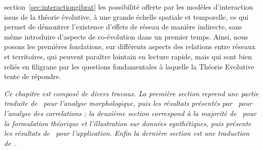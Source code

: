 section~\ref{sec:interactiongibrat} les possibilité offerte par les modèles d'interaction issus de la théorie évolutive, à une grande échelle spatiale et temporelle, ce qui permet de démontrer l'existence d'effets de réseau de manière indirecte, sans même introduire d'aspects de co-évolution dans un premier temps. Ainsi, nous posons les premières fondations, sur différents aspects des relations entre réseaux et territoires, qui peuvent paraître lointain en lecture rapide, mais qui sont bien reliés en filigrane par les questions fondamentales à laquelle la Théorie Evolutive tente de répondre.




\stars


\textit{Ce chapitre est composé de divers travaux. La première section reprend une partie traduite de~\cite{} pour l'analyse morphologique, puis les résultats présentés par~\cite{raimbault2016cautious} pour l'analyse des correlations ; la deuxième section correspond à la majorité de~\cite{} pour la formulation théorique et l'illustration sur données synthétiques, puis présente les résultats de~\cite{} pour l'application. Enfin la dernière section est une traduction de~\cite{}.}



















